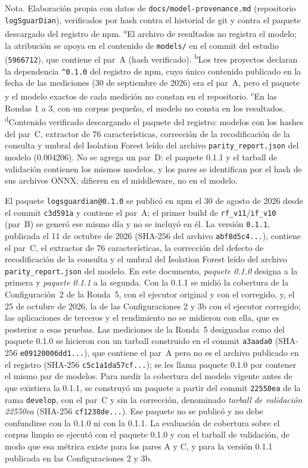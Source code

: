 {\footnotesize Nota. Elaboración propia con datos de \texttt{docs/model-provenance.md} (repositorio
\texttt{logSguarDian}), verificados por hash contra el historial de git y contra el paquete
descargado del registro de npm. \textsuperscript{a}El archivo de resultados no registra el modelo; la
atribución se apoya en el contenido de \texttt{models/} en el commit del estudio (\texttt{5966712}),
que contiene el par~A (hash verificado). \textsuperscript{b}Los tres proyectos declaran la dependencia
\texttt{\^{}0.1.0} del registro de npm, cuyo único contenido publicado en la fecha de las mediciones
(30 de septiembre de 2026) era el par~A, pero el paquete y el modelo exactos de cada medición no
constan en el repositorio. \textsuperscript{c}En las Rondas 1 a 3,
con un corpus pequeño, el modelo no consta en los resultados. \textsuperscript{d}Contenido verificado
descargando el paquete del registro: modelos con los hashes del par~C, extractor de 76
características, corrección de la recodificación de la consulta y umbral del Isolation Forest leído del archivo \texttt{parity\_report.json} del modelo (0.004206). No se agrega un par~D: el paquete 0.1.1 y el tarball
de validación contienen los mismos modelos, y los pares se identifican por el hash de sus archivos
ONNX; difieren en el middleware, no en el modelo.}

El paquete \texttt{logsguardian@0.1.0} se publicó en npm el 30 de agosto de 2026 desde el commit
\texttt{c3d591a} y contiene el par~A; el primer build de \texttt{rf\_v11}/\texttt{if\_v10} (par~B) se
generó ese mismo día y no se incluyó en él. La versión \texttt{0.1.1}, publicada el 11 de octubre de
2026 (SHA-256 del archivo \texttt{abf8d5c4...}), contiene el par~C, el extractor de 76
características, la corrección del defecto de recodificación de la consulta y el umbral del Isolation Forest leído del archivo \texttt{parity\_report.json} del modelo. En este
documento, \textit{paquete 0.1.0}
designa a la primera y \textit{paquete 0.1.1} a la segunda. Con la 0.1.1 se midió la cobertura de la Configuración~2 de la Ronda~5, con el ejecutor
original y con el corregido, y, el 25 de octubre de 2026, la de las Configuraciones 2 y 3b con el
ejecutor corregido; las aplicaciones de terceros y el rendimiento no se midieron con ella,
que es posterior a esas pruebas. Las mediciones de la Ronda~5 designadas como del paquete 0.1.0
se hicieron con un tarball construido en el commit \texttt{a3aada0} (SHA-256 \texttt{e09120006dd1...}),
que contiene el par~A pero no es el archivo publicado en el registro (SHA-256
\texttt{c5c1a1da57cf...}); se les llama paquete 0.1.0 por contener el mismo par de modelos.
Para medir la cobertura del modelo vigente antes de que existiera la 0.1.1, se construyó un
paquete a partir del commit \texttt{22550ea} de la rama \texttt{develop}, con el par~C y sin la
corrección, denominado \textit{tarball de validación 22550ea} (SHA-256 \texttt{cf1238de...}). Ese
paquete no se publicó y no debe confundirse con la 0.1.0 ni con la 0.1.1. La evaluación de
cobertura sobre el corpus limpio se ejecutó con el paquete 0.1.0 y con el tarball de validación,
de modo que esa métrica existe para los pares A y C, y para la versión 0.1.1 publicada en las Configuraciones 2 y 3b.

